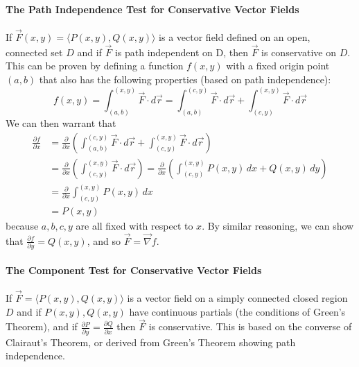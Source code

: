 \documentclass{article}
\newcommand{\vect}[1]{\ensuremath{\overrightarrow{#1}}}
\begin{document}
\paragraph{The Path Independence Test for Conservative Vector Fields}
If $\vect{F}(x,y)=\langle P(x,y), Q(x,y) \rangle$ is a vector field defined on an open, connected set $D$ and if $\vect{F}$ is path independent on D, then $\vect{F}$ is conservative on $D$. This can be proven by defining a function $f(x,y)$ with a fixed origin point $(a,b)$ that also has the following properties (based on path independence):
$$f(x,y) = \int_{(a,b)}^{(x,y)}\vect{F}\cdot d\vect{r} = \int_{(a,b)}^{(c,y)}\vect{F}\cdot d\vect{r} + \int_{(c,y)}^{(x,y)}\vect{F}\cdot d\vect{r}$$
We can then warrant that
\begin{align*}
    \frac{\partial f}{\partial x} &= \frac{\partial}{\partial x}\left( \int_{(a,b)}^{(c,y)}\vect{F}\cdot d\vect{r} + \int_{(c,y)}^{(x,y)}\vect{F}\cdot d\vect{r} \right)\\
    &= \frac{\partial}{\partial x} \left(\int_{(c,y)}^{(x,y)}\vect{F}\cdot d\vect{r} \right) = \frac{\partial}{\partial x} \left(\int_{(c,y)}^{(x,y)}P(x,y)\,dx + Q(x,y)\,dy \right)\\
    &= \frac{\partial}{\partial x}\int_{(c,y)}^{(x,y)}P(x,y)\,dx\\&= P(x,y)
\end{align*}
because $a,b,c,y$ are all fixed with respect to $x$. By similar reasoning, we can show that $\frac{\partial f}{\partial y} = Q(x,y)$, and so $\vect{F} = \vect{\nabla} f$.

\paragraph{The Component Test for Conservative Vector Fields}
If $\vect{F} = \langle P(x,y),Q(x,y)\rangle$ is a vector field on a simply connected closed region $D$ and if $P(x,y), Q(x,y)$ have continuous partials (the conditions of Green's Theorem), and if $\frac{\partial P}{\partial y} = \frac{\partial Q}{\partial x}$ then $\vect{F}$ is conservative. This is based on the converse of Clairaut's Theorem, or derived from Green's Theorem showing path independence.
\end{document}
